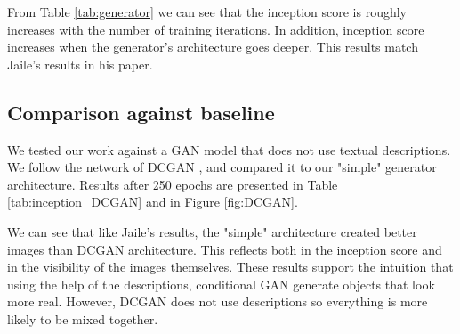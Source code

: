 \documentclass[a4paper]{article}
\begin{document}
From Table \ref{tab:generator} we can see that the inception score is roughly increases with the number of training iterations. In addition, inception score increases when the generator's architecture goes deeper. This results match Jaile's results in his paper.


\subsection{Comparison against baseline}
We tested our work against a GAN model that does not use textual descriptions. We follow the network of DCGAN \cite{radford2015unsupervised}, and compared it to our "simple" generator architecture. Results after 250 epochs are presented in Table \ref{tab:inception_DCGAN} and in Figure \ref{fig:DCGAN}.

We can see that like Jaile's results, the "simple" architecture created better images than DCGAN architecture. This reflects both in the inception score and in the visibility of the images themselves. These results support the intuition that using the help of the descriptions, conditional GAN generate objects that look more real. However, DCGAN does not use descriptions so everything is more likely to be mixed together.
\end{document}
